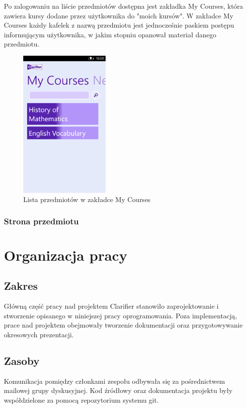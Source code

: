 \documentclass{pracamgr}
\begin{document}
Po zalogowaniu na liście przedmiotów dostępna jest zakładka My Courses, która zawiera kursy dodane przez użytkownika do "moich kursów". W zakładce My Courses każdy kafelek z nazwą przedmiotu jest jednocześnie paskiem postępu informującym użytkownika, w jakim stopniu opanował materiał danego przedmiotu. 

\begin{figure}[t!]
    \centering
    \includegraphics[width=0.4\textwidth]{Progress.png}
    \caption{Lista przedmiotów w zakładce My Courses}
    \label{fig:progress}
\end{figure}

\subsection{Strona przedmiotu}


\chapter{Organizacja pracy}\label{r:org}

\section{Zakres}
Główną część pracy nad projektem Clarifier stanowiło zaprojektowanie i stworzenie opisanego w niniejszej pracy oprogramowania. Poza implementacją, prace nad projektem obejmowały tworzenie dokumentacji oraz przygotowywanie okresowych prezentacji. 

\section{Zasoby}
Komunikacja pomiędzy członkami zespołu odbywała się za pośrednictwem mailowej grupy dyskusyjnej. Kod źródłowy oraz dokumentacja projektu były współdzielone za pomocą repozytorium systemu git.
\end{document}
